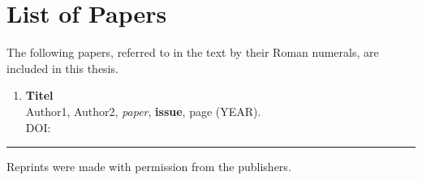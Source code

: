 \chapter{List of Papers}

\vspace{-5pt} %

The following papers, referred to in the text by their Roman numerals, are included in this thesis.

\vspace{0pt} %


\begin{enumerate}[P{A}PER I: ]

\setlength{\itemsep}{3.3mm} %



\item\textbf{Titel}\\
Author1, Author2, \emph{paper}, \textbf{issue}, page (YEAR).\\
DOI: \href{}{} 

\end{enumerate}

\noindent
\rule{\linewidth}{0.5mm}

\vspace{2mm}

\noindent
Reprints were made with permission from the publishers.



